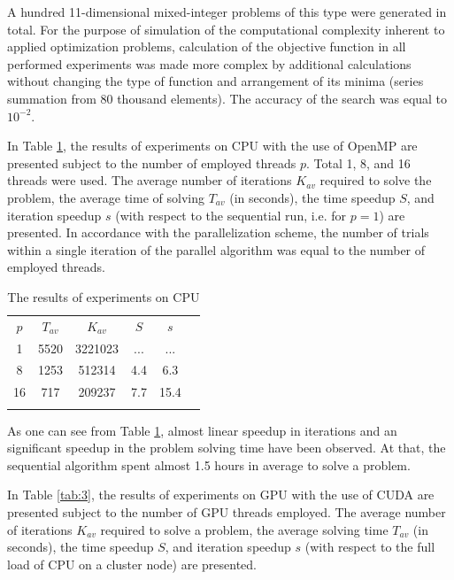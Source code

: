 \documentclass{llncs}
\begin{document}
A hundred 11-dimensional mixed-integer problems of this type were generated in total. 
For the purpose of simulation of the computational complexity inherent to
applied optimization problems, calculation of the objective function in all performed
experiments was made more complex by additional calculations without changing the type
of function and arrangement of its minima (series summation from 80 thousand elements).
The accuracy of the search was equal to $10^{-2}$.%

In Table \ref{tab:2}, the results of experiments on CPU with the use of OpenMP are presented 
subject to the number of employed threads $p$. Total 1, 8, and 16 threads were used. The 
average number of iterations $K_{av}$ required to solve the problem, the average time of 
solving $T_{av}$ (in seconds), the time speedup $S$, and iteration speedup $s$ (with respect 
to the sequential run, i.e. for $p=1$) are presented. In accordance with the parallelization 
scheme, the number of trials within a single iteration of the parallel algorithm was equal to the 
number of employed threads.

\begin{table}
	\caption{The results of experiments on CPU}
	\label{tab:2}
	\center
	\begin{tabular}{cccccc}
		\hline\noalign{\smallskip}        
		$p$ & $T_{av}$ & $K_{av}$ & $S$ & $s$ \\
	\noalign{\smallskip} \hline \noalign{\smallskip}
	1 \;&	5520 \;  & 3221023 \;  & ...\; & ...  \\
	8 \;&	1253 \; & 512314 \;  & 4.4\; & 6.3  \\
	16\;&  717 \; &  209237 \; & 7.7\; & 15.4 \\
		\noalign{\smallskip}\hline
	\end{tabular}
\end{table}

As one can see from Table \ref{tab:2}, almost linear speedup in iterations and an significant 
speedup in the problem solving time have been observed. At that, the sequential algorithm spent 
almost 1.5 hours in average to solve a problem.

In Table \ref{tab:3}, the results of experiments on GPU with the use of CUDA are presented 
subject to the number of GPU threads employed. The average number of iterations $K_{av}$ 
required to solve a problem, the average solving time $T_{av}$ (in seconds), the time speedup 
$S$, and iteration speedup $s$ (with respect to the full load of CPU on a cluster node) are 
presented. 
\end{document}

